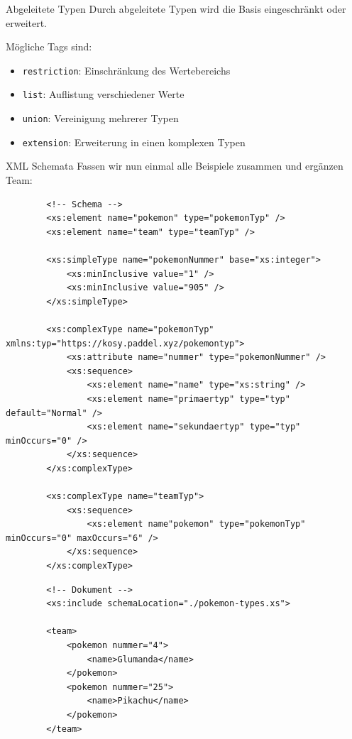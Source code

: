 \begin{bonus}{Abgeleitete Typen}
    Durch abgeleitete Typen wird die Basis eingeschränkt oder erweitert.

    Mögliche Tags sind:

    \begin{itemize}
        \item \texttt{restriction}: Einschränkung des Wertebereichs
        \item \texttt{list}: Auflistung verschiedener Werte
        \item \texttt{union}: Vereinigung mehrerer Typen
        \item \texttt{extension}: Erweiterung in einen komplexen Typen
    \end{itemize}
\end{bonus}

\begin{example}{XML Schemata}
    Fassen wir nun einmal alle Beispiele zusammen und ergänzen Team:

    \begin{lstlisting}
        <!-- Schema -->
        <xs:element name="pokemon" type="pokemonTyp" />
        <xs:element name="team" type="teamTyp" />

        <xs:simpleType name="pokemonNummer" base="xs:integer">
            <xs:minInclusive value="1" />
            <xs:minInclusive value="905" />
        </xs:simpleType>

        <xs:complexType name="pokemonTyp" xmlns:typ="https://kosy.paddel.xyz/pokemontyp">
            <xs:attribute name="nummer" type="pokemonNummer" />
            <xs:sequence>
                <xs:element name="name" type="xs:string" />
                <xs:element name="primaertyp" type="typ" default="Normal" />
                <xs:element name="sekundaertyp" type="typ" minOccurs="0" />
            </xs:sequence>
        </xs:complexType>

        <xs:complexType name="teamTyp">
            <xs:sequence>
                <xs:element name"pokemon" type="pokemonTyp" minOccurs="0" maxOccurs="6" />
            </xs:sequence>
        </xs:complexType>
    \end{lstlisting}

    \begin{lstlisting}
        <!-- Dokument -->
        <xs:include schemaLocation="./pokemon-types.xs">

        <team>
            <pokemon nummer="4">
                <name>Glumanda</name>
            </pokemon>
            <pokemon nummer="25">
                <name>Pikachu</name>
            </pokemon>
        </team>
    \end{lstlisting}
\end{example}

